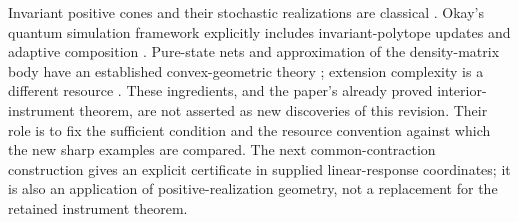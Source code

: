 Invariant positive cones and their stochastic realizations are classical
\cite{Heller65,MonrasWinter14}. Okay's quantum simulation framework explicitly
includes invariant-polytope updates and adaptive composition
\cite{Okay26}. Pure-state nets and approximation of the density-matrix body
have an established convex-geometric theory \cite{AubrunSzarek17}; extension
complexity is a different resource \cite{Fawzi21}. These ingredients, and
the paper's already proved interior-instrument theorem, are not asserted
as new discoveries of this revision. Their role is to fix the sufficient
condition and the resource convention against which the new sharp examples
are compared. The next common-contraction construction gives an explicit
certificate in supplied linear-response coordinates; it is also an
application of positive-realization geometry, not a replacement for the
retained instrument theorem.
